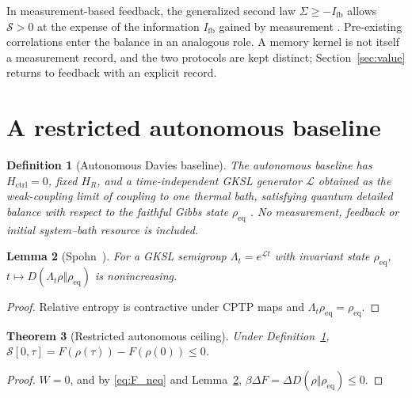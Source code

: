 \documentclass[12pt]{article}
\newtheorem{theorem}{Theorem}
\newtheorem{lemma}[theorem]{Lemma}
\newtheorem{definition}[theorem]{Definition}
\begin{document}
In measurement-based feedback, the generalized second law $\Sigma\ge-I_{\mathrm{fb}}$ allows $\mathcal S>0$ at the expense of the information $I_{\mathrm{fb}}$ gained by measurement \cite{SagawaUeda2008,SagawaUeda2010,SagawaUeda2012}. Pre-existing correlations enter the balance in an analogous role. A memory kernel is not itself a measurement record, and the two protocols are kept distinct; Section~\ref{sec:value} returns to feedback with an explicit record.

\section{A restricted autonomous baseline}
\label{sec:ceiling}

\begin{definition}[Autonomous Davies baseline]
\label{def:autonomous_davies}
The autonomous baseline has $H_{\mathrm{ctrl}}=0$, fixed $H_R$, and a time-independent GKSL generator $\mathcal L$ obtained as the weak-coupling limit of coupling to one thermal bath, satisfying quantum detailed balance with respect to the faithful Gibbs state $\rho_{\mathrm{eq}}$ \cite{Spohn1978,BreuerPetruccione2002}. No measurement, feedback or initial system--bath resource is included.
\end{definition}

\begin{lemma}[Spohn~\cite{Spohn1978}]
\label{lem:spohn}
For a GKSL semigroup $\Lambda_t=e^{\mathcal Lt}$ with invariant state $\rho_{\mathrm{eq}}$, $t\mapsto D(\Lambda_t\rho\Vert\rho_{\mathrm{eq}})$ is nonincreasing.
\end{lemma}

\begin{proof}
Relative entropy is contractive under CPTP maps and $\Lambda_t\rho_{\mathrm{eq}}=\rho_{\mathrm{eq}}$.
\end{proof}

\begin{theorem}[Restricted autonomous ceiling]
\label{thm:autonomous_ceiling}
Under Definition~\ref{def:autonomous_davies}, $\mathcal S[0,\tau]=F(\rho(\tau))-F(\rho(0))\le0$.
\end{theorem}

\begin{proof}
$W=0$, and by \eqref{eq:F_neq} and Lemma~\ref{lem:spohn}, $\beta\Delta F=\Delta D(\rho\Vert\rho_{\mathrm{eq}})\le0$.
\end{proof}
\end{document}
